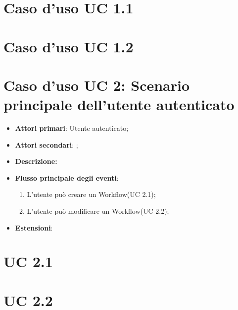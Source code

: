 \section{Caso d'uso UC 1.1}

\section{Caso d'uso UC 1.2}

\section{Caso d'uso UC 2: Scenario principale dell'utente autenticato}
\begin{itemize}
	\item \textbf{Attori primari}: Utente autenticato;
	\item \textbf{Attori secondari}: ;
	\item \textbf{Descrizione:}
	\item \textbf{Flusso principale degli eventi}:
	\begin{enumerate}
		\item L'utente può creare un Workflow(UC 2.1);
		\item L'utente può modificare un Workflow(UC 2.2);
	\end{enumerate}
	\item \textbf{Estensioni}:

\end{itemize}

\section{UC 2.1}

\section{UC 2.2}

